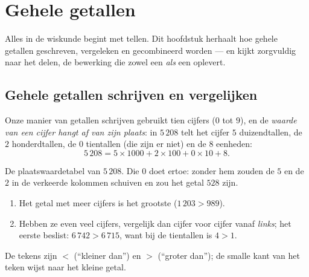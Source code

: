 \chapter{Gehele getallen}\label{ch:g6:wholes}

Alles in de wiskunde begint met tellen. Dit hoofdstuk herhaalt hoe gehele
getallen geschreven, vergeleken en gecombineerd worden --- en kijkt zorgvuldig
naar het delen, de bewerking die zowel een  \emph{als} een 
oplevert.

\section{Gehele getallen schrijven en vergelijken}

\begin{definition}[Plaatswaarde]\label{def:g6:wholes:place}
Onze manier van getallen schrijven gebruikt tien cijfers ($0$ tot $9$), en de
\emph{waarde van een cijfer hangt af van zijn plaats}: in
$5\,208$ telt het cijfer $5$ duizendtallen, de $2$ honderdtallen, de $0$
tientallen (die zijn er niet) en de $8$ eenheden:
\[
5\,208 = 5 \times 1000 + 2 \times 100 + 0 \times 10 + 8 .
\]
\end{definition}

\begin{omfigure}

{\small De plaatswaardetabel van $5\,208$. Die $0$ doet ertoe: zonder hem
zouden de $5$ en de $2$ in de verkeerde kolommen schuiven en zou het getal
$528$ zijn.}
\end{omfigure}

\begin{method}\label{met:g6:wholes:compare}
\begin{enumerate}
  \item Het getal met meer cijfers is het grootste ($1\,203 > 989$).
  \item Hebben ze even veel cijfers, vergelijk dan cijfer voor cijfer vanaf
        \emph{links}; het eerste  beslist: $6\,742 > 6\,715$, want
        bij de tientallen is $4 > 1$.
\end{enumerate}
De tekens zijn $<$ (``kleiner dan'') en $>$ (``groter dan''); de smalle kant
van het teken wijst naar het kleine getal.
\end{method}

